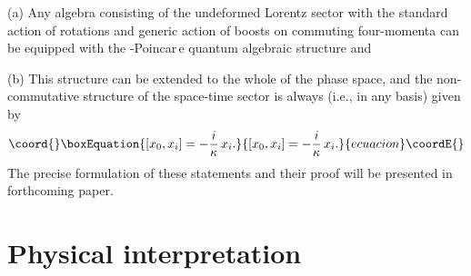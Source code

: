 \documentclass[a4paper,a4paper]{article}
\begin{document}
(a) Any algebra
consisting of the undeformed Lorentz sector  with the standard
action of rotations and generic action of boosts on commuting
four-momenta can be equipped with the \myHighlight{$\kappa$}\coordHE{}-Poincar\,e quantum
algebraic structure and

(b) This structure can be extended to the whole of the phase
space, and the non-commutative structure of the space-time sector
is always (i.e., in any basis) given by
\begin{equation}\coord{}\boxEquation{\label{22}
  [x_0, x_i] =-\frac{i}\kappa\, x_i.
}{[x_0, x_i] =-\frac{i}\kappa\, x_i.
}{ecuacion}\coordE{}\end{equation}
The precise formulation of these statements and their proof will
be presented in forthcoming paper.



\section{Physical interpretation}
\end{document}
